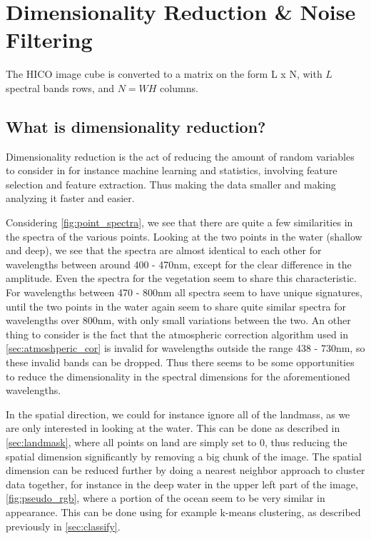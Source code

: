 \section{Dimensionality Reduction \& Noise Filtering}
\label{sec:dim_reduction}

The HICO image cube is converted to a matrix on the form L x N, 
with $L$ spectral bands rows, and $N = WH$ columns. 

\subsection{What is dimensionality reduction?}

Dimensionality reduction is the act of reducing the amount of random variables 
to consider in for instance machine learning and statistics, involving feature 
selection and feature extraction. Thus making the data smaller and making 
analyzing it faster and easier. 

Considering \cref{fig:point_spectra}, we see that there are quite a few similarities 
in the spectra of the various points. Looking at the two points in the water (shallow 
and deep), we see that the spectra are almost identical to each other for wavelengths 
between around 400 - 470nm, except for the clear difference in the amplitude. Even the 
spectra for the vegetation seem to share this characteristic. For wavelengths between 
470 - 800nm all spectra seem to have unique signatures, until the two points in the 
water again seem to share quite similar spectra for wavelengths over 800nm, with only 
small variations between the two. An other thing to consider is the fact that the 
atmospheric correction algorithm used in \cref{sec:atmoshperic_cor} is invalid for 
wavelengths outside the range 438 - 730nm, so these invalid bands can be dropped. 
Thus there seems to be some opportunities to reduce the dimensionality in the 
spectral dimensions for the aforementioned wavelengths.

In the spatial direction, we could for instance ignore all of the landmass, as we 
are only interested in looking at the water. This can be done as described in 
\cref{sec:landmask}, where all points on land are simply set to 0, thus reducing the 
spatial dimension significantly by removing a big chunk of the image. The spatial 
dimension can be reduced further by doing a nearest neighbor approach to cluster data 
together, for instance in the deep water in the upper left part of the image, \cref{fig:pseudo_rgb}, 
where a portion of the ocean seem to be very similar in appearance. This can be done 
using for example k-means clustering, as described previously in \cref{sec:classify}. 

